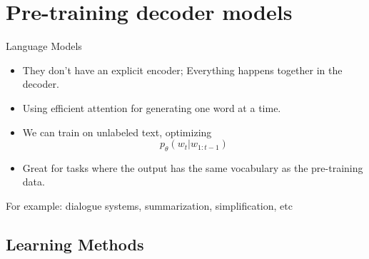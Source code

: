 \documentclass[11pt]{article}
\begin{document}

\section{Pre-training decoder models}

\begin{minipage}[l]{.4\linewidth}
    \begin{figure}[H]
        \centering
    \end{figure}    
\end{minipage}\hfill
\begin{minipage}[r]{.58\linewidth}
    Language Models
    \begin{itemize}
        \item They don't have an explicit encoder; Everything happens together in the decoder.
        \item Using efficient attention for generating one word at a time.
        \item We can train on unlabeled text, optimizing \begin{equation}
            p_\theta(w_t | w_{1:t-1})
        \end{equation}
        \item Great for tasks where the output has the same vocabulary as the pre-training data.
    \end{itemize}
    For example: dialogue systems, summarization, simplification, etc
\end{minipage}

\subsection{Learning Methods}
\end{document}
